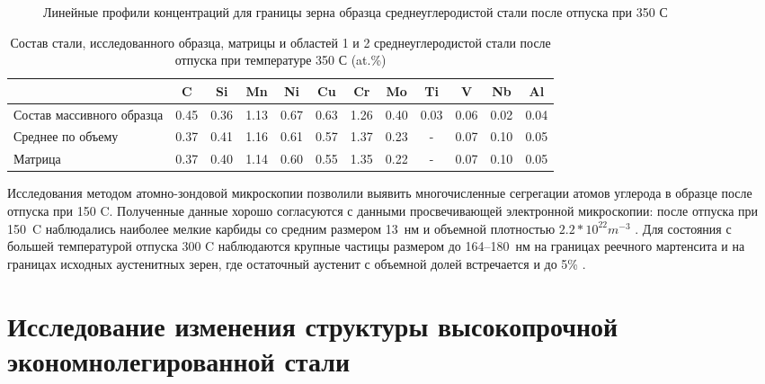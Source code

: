 \begin{figure}[htb]
	\caption{Линейные профили концентраций для границы зерна образца среднеуглеродистой стали после отпуска при 350 \textdegree С \cite{scbibRyabov}}
	\label{fig:SteelLinear2}
\end{figure}

\begin{table} [htbp]
	\centering
	\caption{Состав стали, исследованного образца, матрицы и областей 1 и 2 среднеуглеродистой стали после отпуска при температуре 350 \textdegree С (at.\%)}%
	\label{tab:SteelComposition350}%
	\begin{SingleSpace}
		\begin{tabular}{|p{3cm}| c | c | c | c | c | c | c | c | c | c | c |}
			\hline
			& C & Si & Mn & Ni & Cu & Cr & Mo & Ti & V & Nb & Al     \\ \hline
			Состав массивного образца     & 0.45 & 0.36 & 1.13 & 0.67 & 0.63 & 1.26 & 0.40 & 0.03 & 0.06 & 0.02 & 0.04   \\ \hline
			Среднее по объему   & 0.37 & 0.41 & 1.16 & 0.61 & 0.57 & 1.37 & 0.23 & - & 0.07 & 0.10 & 0.05   \\  \hline		
			Матрица   & 0.37 & 0.40 & 1.14 & 0.60 & 0.55 & 1.35 & 0.22 & - & 0.07 & 0.10 & 0.05   \\  \hline		
		\end{tabular}%
	\end{SingleSpace}
\end{table}
\FloatBarrier
Исследования методом атомно-зондовой микроскопии позволили выявить многочисленные сегрегации атомов углерода в образце после отпуска при 150 \textdegree C. Полученные данные хорошо согласуются с данными просвечивающей электронной микроскопии: после отпуска при 150~\textdegree C наблюдались наиболее мелкие карбиды со средним размером 13~нм и объемной плотностью $2.2*10^{22} m^{-3}$ \cite{scbibRyabov}. Для состояния  с большей температурой отпуска 300 \textdegree C наблюдаются крупные частицы размером до 164–180~нм на границах реечного мартенсита и на границах исходных аустенитных зерен, где остаточный аустенит с объемной долей встречается и до 5\% \cite{scbibRyabov}.

\FloatBarrier

\section{Исследование изменения структуры высокопрочной экономнолегированной стали}\label{sec:ch4/sect3}

